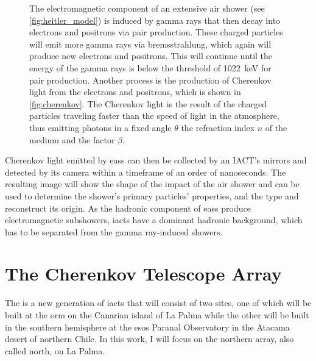 \begin{figure}
\begin{subfigure}[t]{0.45\textwidth}
        \label{fig:cherenkov}
    \end{subfigure}
    \caption{The electromagnetic component of an extensive air shower (see \autoref{fig:heitler_model})
    is induced by gamma rays that then decay into electrons and positrons via pair production.
    These charged particles will emit more gamma rays via bremsstrahlung, which again will produce
    new electrons and positrons. This will continue until \eg the energy of the gamma rays is below
    the threshold of \SI{1022}{\kilo\eV} for pair production. Another process is the production of
    Cherenkov light from the electrons and positrons, which is shown in \autoref{fig:cherenkov}.
    The Cherenkov light is the result of the charged particles traveling faster than the speed of light
    in the atmosphere, thus emitting photons in a fixed angle \(\theta\) \wrt the refraction index
    \(n\) of the medium and the factor \(\beta\).}
    \label{fig:cherenkov_heitler}
\end{figure}

Cherenkov light emitted by \glspl{eas} can then be collected by an IACT's mirrors and detected by
its camera within a timeframe of an order of nanoseconds. The resulting image will show the shape
of the impact of the air shower and can be used to determine the shower's primary particles' properties,
and the type and reconstruct its origin. As the hadronic component of \glspl{eas} produce
electromagnetic subshowers, \glspl{iact} have a dominant hadronic background, which has to be
separated from the gamma ray-induced showers.


\section{The Cherenkov Telescope Array}
\label{sec:cta}

The \cta{} is a new generation of \glspl{iact} that will consist of two sites,
one of which will be built at the \gls{orm} on the Canarian island of La Palma while the other
will be built in the southern hemisphere at the \glspl{eso} Paranal Observatory in the Atacama desert
of northern Chile. In this work, I will focus on the northern array, also called \cta{} north,
on La Palma.

